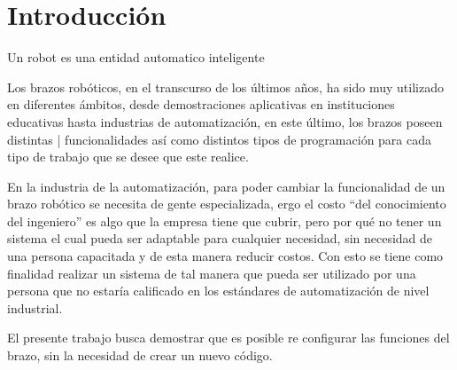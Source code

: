 \documentclass[conference]{IEEEtran}
\begin{document}
\section{Introducción}
Un robot es una entidad automatico inteligente

Los brazos robóticos, en el transcurso de los últimos años, ha sido muy 
utilizado en diferentes ámbitos, desde demostraciones aplicativas en 
instituciones educativas hasta industrias de automatización, en este último,
los brazos poseen distintas | funcionalidades así como distintos tipos de 
programación para cada tipo de trabajo que se desee que este realice.

En la industria de la automatización, para poder cambiar la funcionalidad
de un brazo robótico se necesita de gente especializada, ergo el costo “del 
conocimiento del ingeniero” es algo que la empresa tiene que cubrir, pero 
por qué no tener un sistema el cual pueda ser adaptable para cualquier 
necesidad, sin necesidad de una persona capacitada y de esta manera reducir 
costos. Con esto se tiene como finalidad realizar un sistema de tal manera 
que pueda ser utilizado por una persona que no estaría calificado en los 
estándares de automatización de nivel industrial.

El presente trabajo busca demostrar que es posible re configurar las 
funciones del brazo, sin la necesidad de crear un nuevo código.


\hfill 
 


%
%
\end{document}
